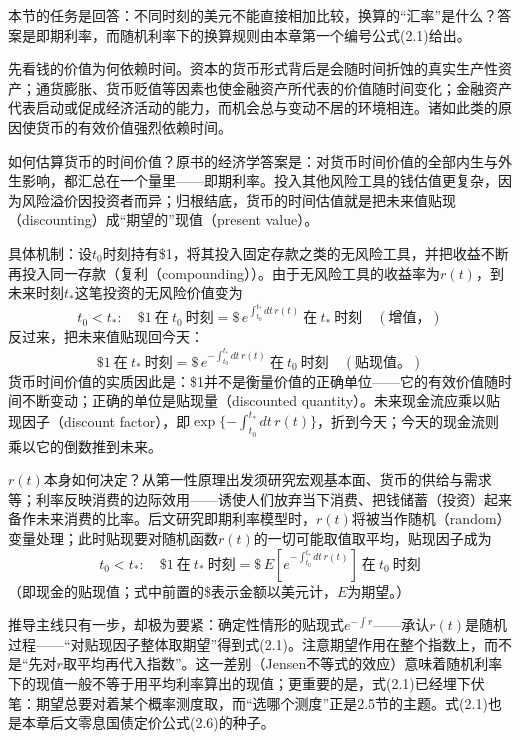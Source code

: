 本节的任务是回答：不同时刻的美元不能直接相加比较，换算的“汇率”是什么？答案是即期利率，而随机利率下的换算规则由本章第一个编号公式(2.1)给出。

先看钱的价值为何依赖时间。资本的货币形式背后是会随时间折蚀的真实生产性资产；通货膨胀、货币贬值等因素也使金融资产所代表的价值随时间变化；金融资产代表启动或促成经济活动的能力，而机会总与变动不居的环境相连。诸如此类的原因使货币的有效价值强烈依赖时间。

如何估算货币的时间价值？原书的经济学答案是：对货币时间价值的全部内生与外生影响，都汇总在一个量里——即期利率。投入其他风险工具的钱估值更复杂，因为风险溢价因投资者而异；归根结底，货币的时间估值就是把未来值贴现（discounting）成“期望的”现值（present value）。

具体机制：设$t_0$时刻持有\$1，将其投入固定存款之类的无风险工具，并把收益不断再投入同一存款（复利（compounding））。由于无风险工具的收益率为$r(t)$，到未来时刻$t_*$这笔投资的无风险价值变为
\begin{equation*}
t_0<t_*:\quad \$1\ \text{在}\ t_0\ \text{时刻}
=\$\,e^{\int_{t_0}^{t_*}dt\,r(t)}\ \text{在}\ t_*\ \text{时刻}\quad(\text{增值，})
\end{equation*}
反过来，把未来值贴现回今天：
\begin{equation*}
\$1\ \text{在}\ t_*\ \text{时刻}
=\$\,e^{-\int_{t_0}^{t_*}dt\,r(t)}\ \text{在}\ t_0\ \text{时刻}\quad(\text{贴现值。})
\end{equation*}
货币时间价值的实质因此是：\$1并不是衡量价值的正确单位——它的有效价值随时间不断变动；正确的单位是贴现量（discounted quantity）。未来现金流应乘以贴现因子（discount factor），即$\exp\{-\int_{t_0}^{t_*}dt\,r(t)\}$，折到今天；今天的现金流则乘以它的倒数推到未来。

$r(t)$本身如何决定？从第一性原理出发须研究宏观基本面、货币的供给与需求等；利率反映消费的边际效用——诱使人们放弃当下消费、把钱储蓄（投资）起来备作未来消费的比率。后文研究即期利率模型时，$r(t)$将被当作随机（random）变量处理；此时贴现要对随机函数$r(t)$的一切可能取值取平均，贴现因子成为
\begin{equation*}
t_0<t_*:\quad \$1\ \text{在}\ t_*\ \text{时刻}
=\$\,E\!\left[e^{-\int_{t_0}^{t_*}dt\,r(t)}\right]\ \text{在}\ t_0\ \text{时刻}
\tag{2.1}
\end{equation*}
（即现金的贴现值；式中前置的\$表示金额以美元计，$E$为期望。）

推导主线只有一步，却极为要紧：确定性情形的贴现式$e^{-\int r}$——承认$r(t)$是随机过程——“对贴现因子整体取期望”得到式(2.1)。注意期望作用在整个指数上，而不是“先对$r$取平均再代入指数”。这一差别（Jensen不等式的效应）意味着随机利率下的现值一般不等于用平均利率算出的现值；更重要的是，式(2.1)已经埋下伏笔：期望总要对着某个概率测度取，而“选哪个测度”正是2.5节的主题。式(2.1)也是本章后文零息国债定价公式(2.6)的种子。

